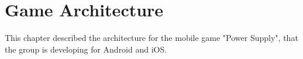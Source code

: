 \chapter{Game Architecture}

	This chapter described the architecture for the mobile game "Power Supply", that the group is 
	developing for Android and iOS. 

